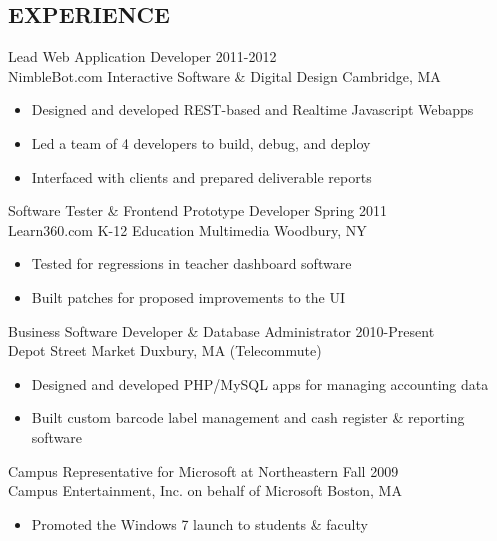 \documentclass[line,margin]{res}
\begin{document}
\begin{resume}
\section{EXPERIENCE}
                {\large Lead Web Application Developer} \hfill 2011-2012 \\
                NimbleBot.com Interactive Software \& Digital Design 
                \hfill Cambridge, MA
                 \begin{itemize}  \itemsep -2pt %
                 \item Designed and developed REST-based and Realtime Javascript Webapps
                 \item Led a team of 4 developers to build, debug, and deploy
                 \item Interfaced with clients and prepared deliverable reports
                \end{itemize}

                {\large Software Tester \& Frontend Prototype Developer}
                \hfill Spring 2011 \\
                Learn360.com K-12 Education Multimedia \hfill Woodbury, NY
                 \begin{itemize}  \itemsep -2pt %
                 \item Tested for regressions in teacher dashboard software
                 \item Built patches for proposed improvements to the UI
                \end{itemize}

                {\large Business Software Developer \& Database Administrator}
                \hfill 2010-Present \\
                Depot Street Market \hfill Duxbury, MA {\footnotesize (Telecommute)}
                 \begin{itemize}  \itemsep -2pt %
                 \item Designed and developed PHP/MySQL apps for managing accounting data
                 \item Built custom barcode label management and cash register \& reporting software
                \end{itemize}

                {\large Campus Representative for Microsoft at Northeastern}
                \hfill Fall 2009 \\
                Campus Entertainment, Inc. on behalf of Microsoft \hfill Boston, MA
                 \begin{itemize}  \itemsep -2pt %
                 \item Promoted the Windows 7 launch to students \& faculty
                \end{itemize}


\end{resume}
\end{document}
